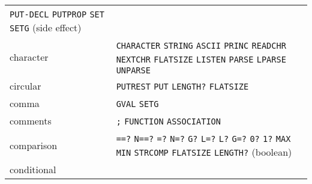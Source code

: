 \documentclass[a4paper]{scrbook}
\begin{document}
\begin{longtable}[]{@{}ll@{}}
\begin{minipage}[t]{0.83\columnwidth}
\texttt{PUT-DECL} \texttt{PUTPROP} \texttt{SET} \texttt{SETG} (side effect)\strut
\end{minipage}\tabularnewline
\begin{minipage}[t]{0.11\columnwidth}\raggedright\strut
character\strut
\end{minipage} & \begin{minipage}[t]{0.83\columnwidth}\raggedright\strut
\texttt{CHARACTER} \texttt{STRING} \texttt{ASCII} \texttt{PRINC} \texttt{READCHR} \texttt{NEXTCHR} \texttt{FLATSIZE}
\texttt{LISTEN} \texttt{PARSE} \texttt{LPARSE} \texttt{UNPARSE}\strut
\end{minipage}\tabularnewline
\begin{minipage}[t]{0.11\columnwidth}\raggedright\strut
circular\strut
\end{minipage} & \begin{minipage}[t]{0.83\columnwidth}\raggedright\strut
\texttt{PUTREST} \texttt{PUT} \texttt{LENGTH?} \texttt{FLATSIZE}\strut
\end{minipage}\tabularnewline
\begin{minipage}[t]{0.11\columnwidth}\raggedright\strut
comma\strut
\end{minipage} & \begin{minipage}[t]{0.83\columnwidth}\raggedright\strut
\texttt{GVAL} \texttt{SETG}\strut
\end{minipage}\tabularnewline
\begin{minipage}[t]{0.11\columnwidth}\raggedright\strut
comments\strut
\end{minipage} & \begin{minipage}[t]{0.83\columnwidth}\raggedright\strut
\texttt{;} \texttt{FUNCTION} \texttt{ASSOCIATION}\strut
\end{minipage}\tabularnewline
\begin{minipage}[t]{0.11\columnwidth}\raggedright\strut
comparison\strut
\end{minipage} & \begin{minipage}[t]{0.83\columnwidth}\raggedright\strut
\texttt{==?} \texttt{N==?} \texttt{=?} \texttt{N=?} \texttt{G?} \texttt{L=?} \texttt{L?} \texttt{G=?} \texttt{0?}
\texttt{1?} \texttt{MAX} \texttt{MIN} \texttt{STRCOMP} \texttt{FLATSIZE} \texttt{LENGTH?} (boolean)\strut
\end{minipage}\tabularnewline
\begin{minipage}[t]{0.11\columnwidth}\raggedright\strut
conditional\strut
\end{minipage} & \begin{minipage}[t]{0.83\columnwidth}\raggedright\strut

\end{minipage}
\end{longtable}
\end{document}
